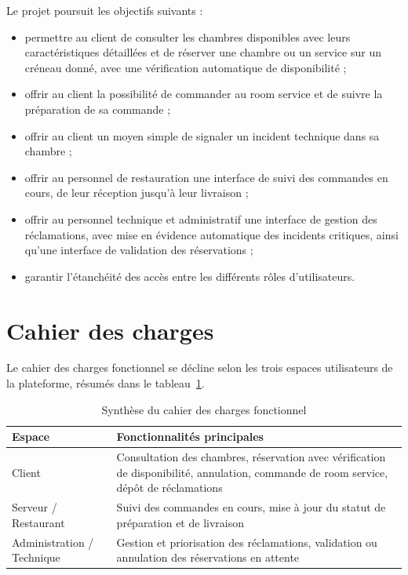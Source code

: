 \documentclass[12pt,a4paper]{report}
\begin{document}
Le projet poursuit les objectifs suivants :
\begin{itemize}
    \item permettre au client de consulter les chambres disponibles avec
    leurs caractéristiques détaillées et de réserver une chambre ou un
    service sur un créneau donné, avec une vérification automatique de
    disponibilité ;
    \item offrir au client la possibilité de commander au room service et
    de suivre la préparation de sa commande ;
    \item offrir au client un moyen simple de signaler un incident
    technique dans sa chambre ;
    \item offrir au personnel de restauration une interface de suivi des
    commandes en cours, de leur réception jusqu'à leur livraison ;
    \item offrir au personnel technique et administratif une interface de
    gestion des réclamations, avec mise en évidence automatique des
    incidents critiques, ainsi qu'une interface de validation des
    réservations ;
    \item garantir l'étanchéité des accès entre les différents rôles
    d'utilisateurs.
\end{itemize}

\section{Cahier des charges}

Le cahier des charges fonctionnel se décline selon les trois espaces
utilisateurs de la plateforme, résumés dans le tableau~\ref{tab:cahier}.

\begin{table}[H]
\centering
\begin{tabular}{p{3cm} p{9cm}}
\toprule
\textbf{Espace} & \textbf{Fonctionnalités principales} \\
\midrule
Client & Consultation des chambres, réservation avec vérification de
disponibilité, annulation, commande de room service, dépôt de
réclamations \\
Serveur / Restaurant & Suivi des commandes en cours, mise à jour du statut
de préparation et de livraison \\
Administration / Technique & Gestion et priorisation des réclamations,
validation ou annulation des réservations en attente \\
\bottomrule
\end{tabular}
\caption{Synthèse du cahier des charges fonctionnel}
\label{tab:cahier}
\end{table}
\end{document}
